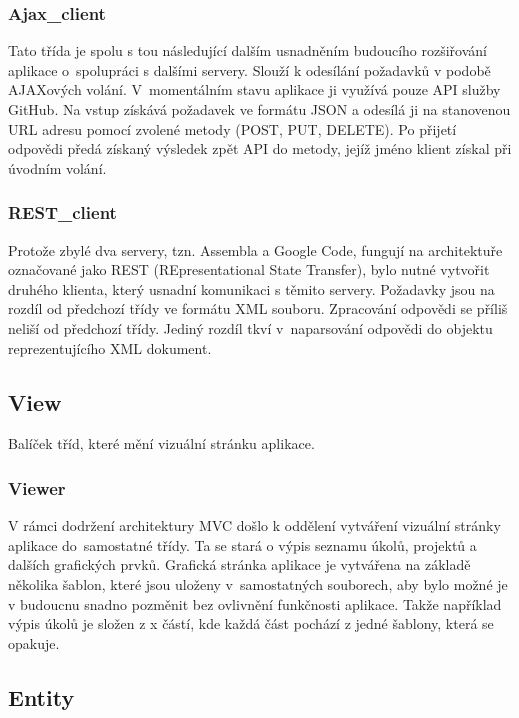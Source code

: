 \subsubsection{Ajax\_client}

Tato třída je spolu s tou následující dalším usnadněním budoucího rozšiřování aplikace o~spolupráci s dalšími servery. Slouží k odesílání požadavků v podobě AJAXových volání. V~momentálním stavu aplikace ji využívá pouze API služby GitHub. Na vstup získává požadavek ve formátu JSON a odesílá ji na stanovenou URL adresu pomocí zvolené metody (POST, PUT, DELETE). Po přijetí odpovědi předá získaný výsledek zpět API do metody, jejíž jméno klient získal při úvodním volání.

\subsubsection{REST\_client}

Protože zbylé dva servery, tzn. Assembla a Google Code, fungují na architektuře označované jako REST (REpresentational State Transfer), bylo nutné vytvořit druhého klienta, který usnadní komunikaci s těmito servery. Požadavky jsou na rozdíl od předchozí třídy ve formátu XML souboru. Zpracování odpovědi se příliš neliší od předchozí třídy. Jediný rozdíl tkví v~naparsování odpovědi do objektu reprezentujícího XML dokument.

\subsection{View}

Balíček tříd, které mění vizuální stránku aplikace.

\subsubsection{Viewer}

V rámci dodržení architektury MVC došlo k oddělení vytváření vizuální stránky aplikace do~samostatné třídy. Ta se stará o výpis seznamu úkolů, projektů a dalších grafických prvků. Grafická stránka aplikace je vytvářena na základě několika šablon, které jsou uloženy v~samostatných souborech, aby bylo možné je v budoucnu snadno pozměnit bez ovlivnění funkčnosti aplikace. Takže například výpis úkolů je složen z x částí, kde každá část pochází z jedné šablony, která se opakuje.

\subsection{Entity}


